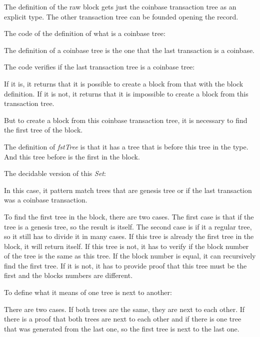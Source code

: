 
The definition of the raw block gets just the coinbase transaction tree as an explicit type.
The other transaction tree can be founded opening the record.


The code of the definition of what is a coinbase tree:


The definition of a coinbase tree is the one that the last transaction is a coinbase.

The code verifies if the last transaction tree is a coinbase tree:


If it is, it returns that it is possible to create a block from that with the block definition.
If it is not, it returns that it is impossible to create a block from this transaction tree.

But to create a block from this coinbase transaction tree, it is necessary to find the first tree
of the block.


The definition of \emph{fstTree} is that it has a tree that is before this tree in the type.
And this tree before is the first in the block.


The decidable version of this \emph{Set}:


In this case, it pattern match trees that are genesis tree or if the last transaction was a coinbase
transaction.


To find the first tree in the block, there are two cases.
The first case is that if the tree is a genesis tree, so the result is itself.
The second case is if it a regular tree, so it still has to divide it in many cases.
If this tree is already the first tree in the block, it will return itself.
If this tree is not, it has to verify if the block number of the tree is the same as this tree.
If the block number is equal, it can recursively find the first tree.
If it is not, it has to provide proof that this tree must be
the first and the blocks numbers are different.

To define what it means of one tree is next to another:


There are two cases. If both trees are the same, they are next to each other.
If there is a proof that both trees are next to each other and
if there is one tree that was generated from the last one,
so the first tree is next to the last one.
